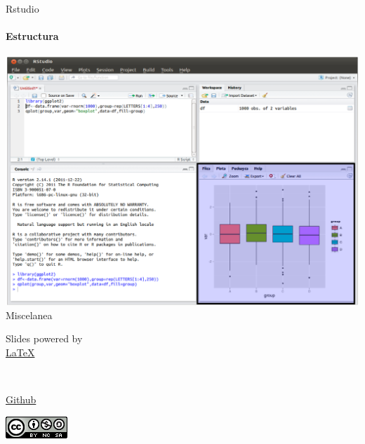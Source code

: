 \documentclass[12pt]{beamer}
\begin{document}
\begin{frame}{Rstudio}
\framesubtitle{Estructura}
\begin{center}
\includegraphics[scale=0.32]{images/rstudio4}\\
\footnotesize{Miscelanea}
\end{center}
\end{frame}


\begin{frame}
\begin{center}
\begin{LARGE}
Slides powered by\\
\href{https://latex-project.org/intro.html}{\LaTeX}
\end{LARGE}\\
\end{center}
\begin{center}
\href{https://github.com/dpabon/R_introduction}{Github}\\
\end{center}
\begin{center}
\includegraphics[scale=0.4]{images/cc}
\end{center}
\end{frame}
\end{document}
